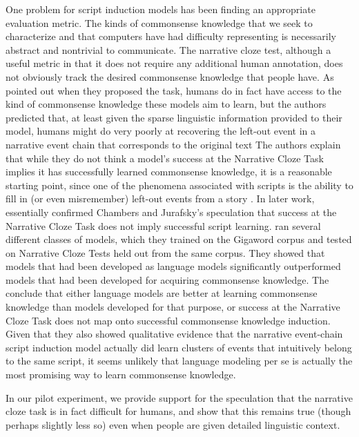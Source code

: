 \documentclass[10pt,a4paper]{article}
\begin{document}
One problem for script induction models has been finding an appropriate evaluation metric.
The kinds of commonsense knowledge that we seek to characterize and that computers have had difficulty representing is necessarily abstract and nontrivial to communicate.
The narrative cloze test, although a useful metric in that it does not require any additional human annotation, does not obviously track the desired commonsense knowledge that people have.
As  pointed out when they proposed the task, humans do in fact have access to the kind of commonsense knowledge these models aim to learn, but the authors predicted that, at least given the sparse linguistic information provided to their model, humans might do very poorly at recovering the left-out event in a narrative event chain that corresponds to the original text
The authors explain that while they do not think a model’s success at the Narrative Cloze Task implies it has successfully learned commonsense knowledge, it is a reasonable starting point, since one of the phenomena associated with scripts is the ability to fill in (or even misremember) left-out events from a story \cite{schank1977scripts,bower1979scripts}.
In later work,  essentially confirmed Chambers and Jurafsky’s speculation that success at the Narrative Cloze Task does not imply successful script learning.  ran several different classes of models, which they trained on the Gigaword corpus and tested on Narrative Cloze Tests held out from the same corpus. They showed that models that had been developed as language models significantly outperformed models that had been developed for acquiring commonsense knowledge. The conclude that either language models are better at learning commonsense knowledge than models developed for that purpose, or success at the Narrative Cloze Task does not map onto successful commonsense knowledge induction.
Given that they also showed qualitative evidence that the narrative event-chain script induction model actually did learn clusters of events that intuitively belong to the same script, it seems unlikely that language modeling per se is actually the most promising way to learn commonsense knowledge.

In our pilot experiment, we provide support for the speculation that the narrative cloze task is in fact difficult for humans, and show that this remains true (though perhaps slightly less so) even when people are given detailed linguistic context.

\end{document}
